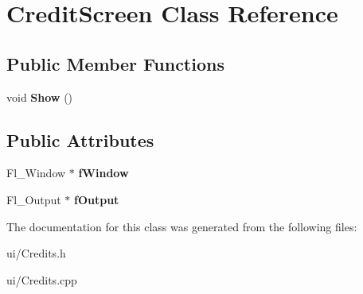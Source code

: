 \hypertarget{classCreditScreen}{\section{\-Credit\-Screen \-Class \-Reference}
\label{classCreditScreen}
}
\subsection*{\-Public \-Member \-Functions}
\begin{DoxyCompactItemize}
\item 
\hypertarget{classCreditScreen_a04d0cf9cbead7250a331c0feca10fba3}{void {\bfseries \-Show} ()}\label{classCreditScreen_a04d0cf9cbead7250a331c0feca10fba3}

\end{DoxyCompactItemize}
\subsection*{\-Public \-Attributes}
\begin{DoxyCompactItemize}
\item 
\hypertarget{classCreditScreen_a0f4059e084ecf45b1eaac3dca6eaca5f}{\-Fl\-\_\-\-Window $\ast$ {\bfseries f\-Window}}\label{classCreditScreen_a0f4059e084ecf45b1eaac3dca6eaca5f}

\item 
\hypertarget{classCreditScreen_af9e14df472003714be5fe932f9f5eb21}{\-Fl\-\_\-\-Output $\ast$ {\bfseries f\-Output}}\label{classCreditScreen_af9e14df472003714be5fe932f9f5eb21}

\end{DoxyCompactItemize}


\-The documentation for this class was generated from the following files\-:\begin{DoxyCompactItemize}
\item 
ui/\-Credits.\-h\item 
ui/\-Credits.\-cpp\end{DoxyCompactItemize}
